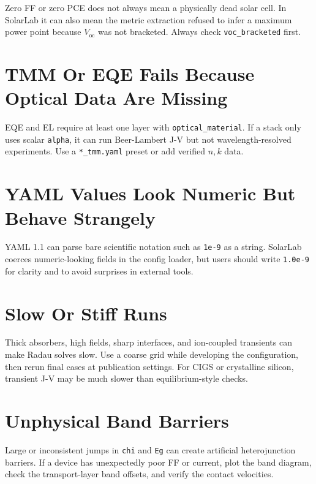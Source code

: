 \documentclass[
  11pt,
  american,
]{report}
\begin{document}
Zero FF or zero PCE does not always mean a physically dead solar cell.
In SolarLab it can also mean the metric extraction refused to infer a
maximum power point because \(V_\mathrm{oc}\) was not bracketed. Always
check \texttt{voc\_bracketed} first.

\hypertarget{tmm-or-eqe-fails-because-optical-data-are-missing}{%
\section{TMM Or EQE Fails Because Optical Data Are
Missing}\label{tmm-or-eqe-fails-because-optical-data-are-missing}}

EQE and EL require at least one layer with \texttt{optical\_material}.
If a stack only uses scalar \texttt{alpha}, it can run Beer-Lambert J-V
but not wavelength-resolved experiments. Use a \texttt{*\_tmm.yaml}
preset or add verified \(n,k\) data.

\hypertarget{yaml-values-look-numeric-but-behave-strangely}{%
\section{YAML Values Look Numeric But Behave
Strangely}\label{yaml-values-look-numeric-but-behave-strangely}}

YAML 1.1 can parse bare scientific notation such as \texttt{1e-9} as a
string. SolarLab coerces numeric-looking fields in the config loader,
but users should write \texttt{1.0e-9} for clarity and to avoid
surprises in external tools.

\hypertarget{slow-or-stiff-runs}{%
\section{Slow Or Stiff Runs}\label{slow-or-stiff-runs}}

Thick absorbers, high fields, sharp interfaces, and ion-coupled
transients can make Radau solves slow. Use a coarse grid while
developing the configuration, then rerun final cases at publication
settings. For CIGS or crystalline silicon, transient J-V may be much
slower than equilibrium-style checks.

\hypertarget{unphysical-band-barriers}{%
\section{Unphysical Band Barriers}\label{unphysical-band-barriers}}

Large or inconsistent jumps in \texttt{chi} and \texttt{Eg} can create
artificial heterojunction barriers. If a device has unexpectedly poor FF
or current, plot the band diagram, check the transport-layer band
offsets, and verify the contact velocities.
\end{document}
